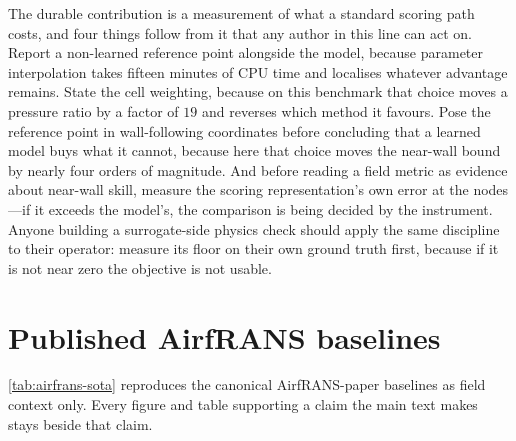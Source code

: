 The durable contribution is a measurement of what a standard scoring path costs, and four
things follow from it that any author in this line can act on. Report a non-learned
reference point alongside the model, because parameter interpolation takes fifteen minutes
of CPU time and localises whatever advantage remains. State the cell weighting, because on
this benchmark that choice moves a pressure ratio by a factor of $19$ and reverses which
method it favours. Pose the reference point in wall-following coordinates before
concluding that a learned model buys what it cannot, because here that choice moves the
near-wall bound by nearly four orders of magnitude. And before reading a field metric as evidence about near-wall skill, measure the
scoring representation's own error at the nodes---if it exceeds the model's, the comparison
is being decided by the instrument. Anyone building a surrogate-side physics check should
apply the same discipline to their operator: measure its floor on their own ground truth
first, because if it is not near zero the objective is not usable.

\appendix

\section{Published AirfRANS baselines}

\autoref{tab:airfrans-sota} reproduces the canonical AirfRANS-paper baselines as field
context only. Every figure and table supporting a claim the main text makes stays beside
that claim.

